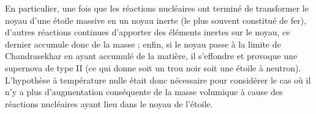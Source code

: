 \documentclass[../Notes de cours]{subfiles}
\begin{document}
En particulier, une fois que les réactions nucléaires ont terminé de transformer le noyau d'une étoile massive en un noyau inerte (le plus souvent constitué de fer), d'autres réactions continues d'apporter des éléments inertes sur le noyau, ce dernier accumule donc de la masse ; enfin, si le noyau passe à la limite de Chandrasekhar en ayant accumulé de la matière, il s'effondre et provoque une supernova de type II (ce qui donne soit un trou noir soit une étoile à neutron).\\
L'hypothèse à température nulle était donc nécessaire pour considérer le cas où il n'y a plus d'augmentation conséquente de la masse volumique à cause des réactions nucléaires ayant lieu dans le noyau de l'étoile. 
\end{document}
